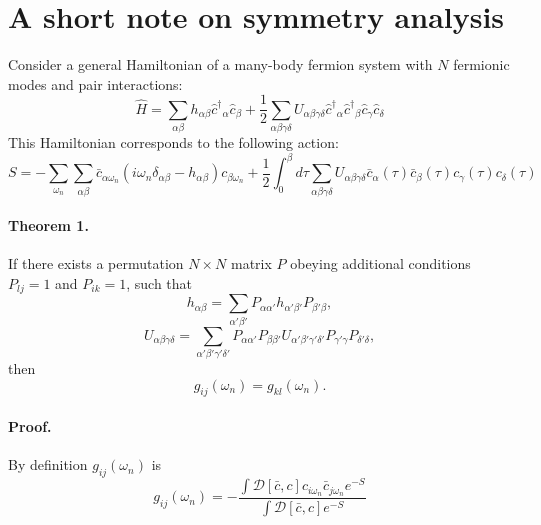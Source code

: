 \documentclass{article}
\newcommand{\bc}{\ensuremath{\bar c}}
\newcommand{\hc}{\ensuremath{\hat c}}
\newcommand{\hcd}{\ensuremath{\hat c^\dagger}}
\begin{document}
\section{A short note on symmetry analysis}

Consider a general Hamiltonian of a many-body fermion system with $N$ fermionic modes and
pair interactions:
\begin{equation}\label{Hamiltonian}
    \hat H = \sum_{\alpha\beta} h_{\alpha\beta}\hcd_\alpha \hc_\beta +
        \frac{1}{2}\sum_{\alpha\beta\gamma\delta} U_{\alpha\beta\gamma\delta}
        \hcd_\alpha \hcd_\beta \hc_\gamma \hc_\delta
\end{equation}
This Hamiltonian corresponds to the following action:    
\begin{equation}\label{action}
    S = -\sum_{\omega_n}\sum_{\alpha\beta}
        \bc_{\alpha\omega_n}(i\omega_n\delta_{\alpha\beta}-h_{\alpha\beta})c_{\beta\omega_n} +
        \frac{1}{2}\int_0^\beta d\tau
        \sum_{\alpha\beta\gamma\delta}U_{\alpha\beta\gamma\delta}
        \bc_{\alpha}(\tau)\bc_{\beta}(\tau)c_{\gamma}(\tau)c_\delta(\tau)
\end{equation}

\paragraph{Theorem 1.} If there exists a permutation $N\times N$ matrix $P$ obeying additional
conditions $P_{lj}=1$ and $P_{ik}=1$, such that
\begin{equation}\label{theorem1:eq_h}
    h_{\alpha\beta} =
        \sum_{\alpha'\beta'}P_{\alpha\alpha'} h_{\alpha'\beta'} P_{\beta'\beta},
\end{equation}
\begin{equation}\label{theorem1:eq_U}
    U_{\alpha\beta\gamma\delta} = \sum_{\alpha'\beta'\gamma'\delta'}
        P_{\alpha\alpha'}P_{\beta\beta'}
        U_{\alpha'\beta'\gamma'\delta'}
        P_{\gamma'\gamma}P_{\delta'\delta},
\end{equation}
then
\begin{equation}\label{theorem1:result}
    g_{ij}(\omega_n) = g_{kl}(\omega_n).
\end{equation}

\paragraph{Proof.} By definition $g_{ij}(\omega_n)$ is
\begin{equation}
    g_{ij}(\omega_n) = -\frac{\int\mathcal{D}[\bc,c]c_{i\omega_n}\bc_{j\omega_n}e^{-S}}
        {\int\mathcal{D}[\bc,c]e^{-S}}
\end{equation}
\end{document}

